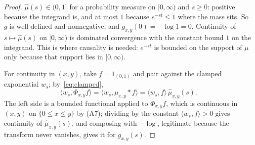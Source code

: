 \begin{proof}
$\hat\mu(s) \in (0, 1]$ for a probability measure on $[0,\infty)$ and $s \ge 0$: positive
because the integrand is, and at most $1$ because $e^{-st} \le 1$ where the mass sits. So $g$
is well defined and nonnegative, and $g_{x,y}(0) = -\log 1 = 0$. Continuity of
$s \mapsto \hat\mu(s)$ on $[0,\infty)$ is dominated convergence with the constant bound $1$
on the integrand. This is where causality is needed: $e^{-st}$ is bounded on the support of
$\mu$ only because that support lies in $[0,\infty)$.

For continuity in $(x,y)$, take $f = 1_{(0,1)}$ and pair against the clamped exponential
$w_s$; by~\eqref{eq:clamped},
\[
  \langle w_s, \Phi_{x,y} f\rangle
  = \langle w_s, \mu_{x,y} * f\rangle = \langle w_s, f\rangle\,\hat\mu_{x,y}(s).
\]
The left side is a bounded functional applied to $\Phi_{x,y} f$, which is continuous in $(x,y)$
on $\{0 \le x \le y\}$ by (A7); dividing by the constant $\langle w_s, f\rangle > 0$ gives
continuity of $\hat\mu_{x,y}(s)$, and composing with $-\log$, legitimate because the transform
never vanishes, gives it for $g_{x,y}(s)$.
\end{proof}

